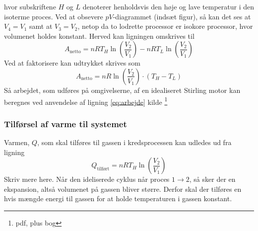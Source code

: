 \documentclass[SRC.tex]{subfiles}
\begin{document}
	hvor subskriftene \(H\) og \(L\) denoterer henholdsvis den høje og lave temperatur i den isoterme
	proces. Ved at obsevere \(pV\)-diagrammet (indsæt figur), så kan det ses at \(V_4 = V_1\) samt 
	at \(V_3 = V_2\), netop da to lodrette processor er isokore processor, hvor volumenet holdes konstant. Herved kan ligningen omskrives til
	\begin{equation}
	A_{\text{netto}} = nRT_H\ln\left(\frac{V_2}{V_1}\right)-nRT_L\ln\left(\frac{V_2}{V_1}\right)
	\end{equation}
	Ved at faktorisere kan udtrykket skrives som
	\begin{equation}
		A_{\text{netto}}= nR\ln\left(\frac{V_2}{V_1}\right)\cdot (T_H - T_L)
		\label{eq:arbejde}
	\end{equation}
	Så arbejdet, som udføres på omgivelserne, af en idealiseret Stirling motor kan beregnes ved anvendelse af ligning \eqref{eq:arbejde}
	kilde \footnote{pdf, plus bog}
	
	\subsubsection{Tilførsel af varme til systemet}
	Varmen, \(Q\), som skal tilføres til gassen i kredsprocessen kan udledes ud fra ligning
	\begin{equation}
		Q_{\text{tilført}} = nRT_H\ln\left(\frac{V_2}{V_1}\right)
		\label{eq:varme}
	\end{equation}
	Skriv mere here. Når den ideliserede cyklus når proces \(1 \rightarrow 2\), så sker der en 
	ekspansion, altså volumenet på gassen bliver større. Derfor skal der tilføres en hvis mængde 
	energi til gassen for at holde temperaturen i gassen konstant. 
\end{document}
